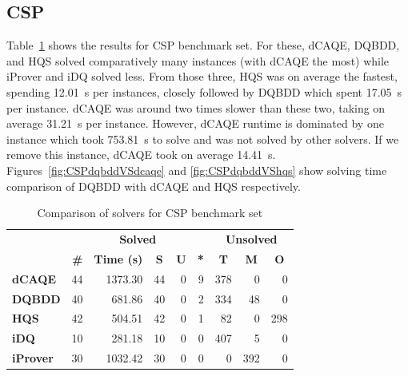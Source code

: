 \documentclass[
  digital, %
  color,
  twoside, %
  table,   %
  nolof,     %
  nolot,     %
]{fithesis3}
\theoremstyle{definition}
\theoremstyle{remark}
\begin{document}
\subsection{CSP}
Table~\ref{tab:CSP} shows the results for CSP benchmark set. For these, dCAQE, DQBDD, and HQS solved comparatively many instances (with dCAQE the most) while iProver and iDQ solved less. From those three, HQS was on average the fastest, spending \SI{12.01}{s} per instances, closely followed by DQBDD which spent \SI{17.05}{s} per instance. dCAQE was around two times slower than these two, taking on average \SI{31.21}{s} per instance. However, dCAQE runtime is dominated by one instance which took \SI{753.81}{s} to solve and was not solved by other solvers. If we remove this instance, dCAQE took on average \SI{14.41}{s}. Figures~\ref{fig:CSPdqbddVSdcaqe} and \ref{fig:CSPdqbddVShqs} show solving time comparison of DQBDD with dCAQE and HQS respectively.

\begin{table}[ht]
\centering
\caption{Comparison of solvers for CSP benchmark set}%
\label{tab:CSP}
\begin{tabular}{|l|r|r|r|r|r|r|r|r|}
\hline
\multicolumn{1}{|c|}{}                                  & \multicolumn{5}{c|}{\textbf{Solved}}                                                                                                                                        & \multicolumn{3}{c|}{\textbf{Unsolved}}                                                                 \\  \hhline{~*{8}{-}}
\multicolumn{1}{|c|}{\multirow{-2}{*}{\textbf{Solver}}} & \multicolumn{1}{c|}{\textbf{\#}} & \multicolumn{1}{c|}{\textbf{Time (s)}} & \multicolumn{1}{c|}{\textbf{S}} & \multicolumn{1}{c|}{\textbf{U}} & \multicolumn{1}{c|}{\textbf{*}} & \multicolumn{1}{c|}{\textbf{T}} & \multicolumn{1}{c|}{\textbf{M}} & \multicolumn{1}{c|}{\textbf{O}} \\ \hline
\textbf{dCAQE} & \num{44} & \num{1373.30} & \num{44} & \num{0} & \num{9} & \num{378} & \num{0} & \num{0} \\ \hline
\textbf{DQBDD} & \num{40} & \num{681.86} & \num{40} & \num{0} & \num{2} & \num{334} & \num{48} & \num{0} \\ \hline
\textbf{HQS} & \num{42} & \num{504.51} & \num{42} & \num{0} & \num{1} & \num{82} & \num{0} & \num{298} \\ \hline
\textbf{iDQ} & \num{10} & \num{281.18} & \num{10} & \num{0} & \num{0} & \num{407} & \num{5} & \num{0} \\ \hline
\textbf{iProver} & \num{30} & \num{1032.42} & \num{30} & \num{0} & \num{0} & \num{0} & \num{392} & \num{0} \\ \hline
\end{tabular}
\end{table}
\end{document}
